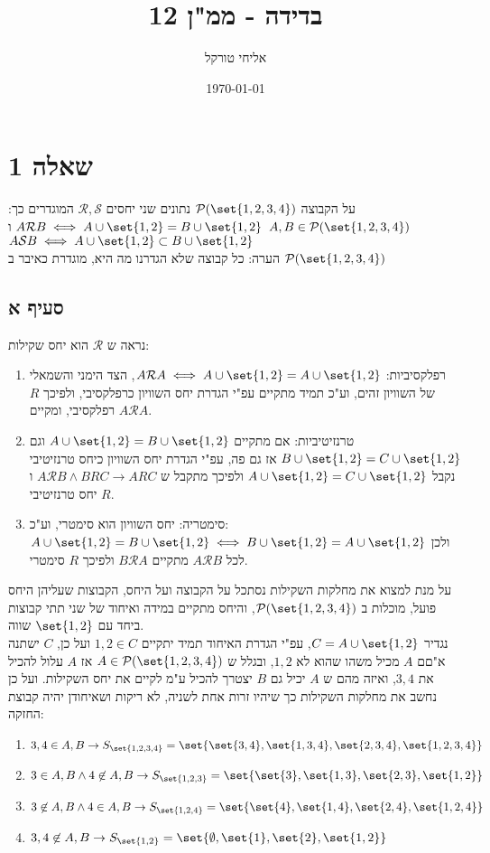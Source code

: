 \documentclass{article}
\title{בדידה - ממ"ן 12}
\author{אליחי טורקל \ID}
\date\today
\DeclarePairedDelimiter\set\{\}
\begin{document}
	\maketitle %

	\section*{שאלה 1}
	על הקבוצה $\PP(\set{1,2,3,4})$ נתונים שני יחסים $\mathcal{R}, \mathcal{S}$ המוגדרים כך:
	 $A,B \in \PP(\set{1,2,3,4})$ $A \mathcal{R} B \iff A \cup \set{1,2} = B \cup \set{1,2}$
	ו $A \mathcal{S} B \iff A \cup \set{1,2} \subset B \cup \set{1,2}$ \\
	הערה: כל קבוצה שלא הגדרנו מה היא, מוגדרת כאיבר ב $\PP(\set{1,2,3,4})$
	\subsection*{סעיף א}
	נראה ש $\mathcal{R}$ הוא יחס שקילות:
\begin{enumerate}
	\item רפלקסיביות:
	$A \mathcal{R} A \iff A \cup \set{1,2} = A \cup \set{1,2}$,
	הצד הימני והשמאלי של השוויון זהים, וע"כ תמיד מתקיים עפ"י הגדרת יחס השוויון כרפלקסיבי,
	ולפיכך $R$ רפלקסיבי, ומקיים $A \mathcal{R} A$.
	\item טרנזיטיביות:
	אם מתקיים $A \cup \set{1,2} = B \cup \set{1,2}$
	וגם $B \cup \set{1,2} = C \cup \set{1,2}$
	אז גם פה, עפ"י הגדרת יחס השוויון כיחס טרנזיטיבי נקבל $A \cup \set{1,2} = C \cup \set{1,2}$
ולפיכך מתקבל ש $A \mathcal{R} B \land BRC \to ARC$ ו $R$ יחס טרנזיטיבי.
	\item סימטריה:
	יחס השוויון הוא סימטרי, וע"כ:\\
	$A \cup \set{1,2} = B \cup \set{1,2} \iff
	B \cup \set{1,2} = A \cup \set{1,2}$
	ולכן לכל $A \mathcal{R} B$ מתקיים $B \mathcal{R} A$ ולפיכך $R$ סימטרי.
\end{enumerate}
על מנת למצוא את מחלקות השקילות נסתכל על הקבוצה ועל היחס,
הקבוצות שעליהן היחס פועל, מוכלות ב $\PP(\set{1,2,3,4})$,
והיחס מתקיים במידה ואיחוד של שני תתי קבוצות ביחד עם $\set{1,2}$ שווה. \\
נגדיר $C = A \cup \set{1,2}$, עפ"י הגדרת האיחוד תמיד יתקיים $1,2 \in C$
ועל כן, $C$ ישתנה א"םם $A$ מכיל משהו שהוא לא $1,2$, ובגלל ש $A \in \PP(\set{1,2,3,4})$
אז $A$ עלול להכיל את $3,4$, ואיזה מהם ש $A$ יכיל גם $B$ יצטרך להכיל ע"מ לקיים את יחס השקילות.
ועל כן נחשב את מחלקות השקילות כך שיהיו זרות אחת לשניה, לא ריקות ושאיחודן יהיה קבוצת החזקה:
\begin{enumerate}
	\item $3,4 \in A,B \to
	S_{\set{1,2,3,4}}=\set{\set{3,4}, \set{1,3,4}, \set{2,3,4}, \set{1,2,3,4}}$
	\item $3 \in A,B \land 4 \not\in A,B \to
	S_{\set{1,2,3}}=\set{\set{3}, \set{1,3}, \set{2,3}, \set{1,2}}$
	\item $3 \not\in A,B \land 4 \in A,B \to
	S_{\set{1,2,4}}=\set{\set{4}, \set{1,4}, \set{2,4}, \set{1,2,4}}$
	\item $3,4 \not\in A,B \to
	S_{\set{1,2}}=\set{\emptyset, \set{1}, \set{2}, \set{1,2}}$
\end{enumerate}
	\pagebreak
\end{document}
